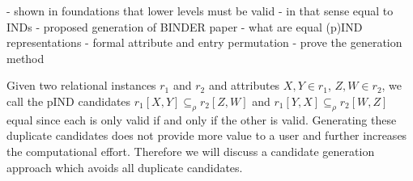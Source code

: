 - shown in foundations that lower levels must be valid
- in that sense equal to INDs
- proposed generation of BINDER paper
- what are equal (p)IND representations
 - formal attribute and entry permutation
- prove the generation method

Given two relational instances $r_1$ and $r_2$ and attributes $X, Y \in r_1$, $Z, W \in r_2$, we call the pIND candidates $r_1[X,Y] \subseteq_\rho r_2[Z,W]$ and $r_1[Y,X] \subseteq_\rho r_2[W,Z]$ equal since each is only valid if and only if the other is valid. Generating these duplicate candidates does not provide more value to a user and further increases the computational effort. Therefore we will discuss a candidate generation approach which avoids all duplicate candidates.